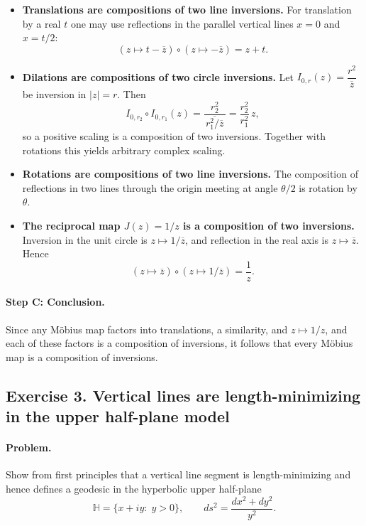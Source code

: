 \documentclass[12pt,a4paper]{article}
\theoremstyle{plain}
\theoremstyle{definition}      %
\begin{document}
\begin{itemize}
	\item \textbf{Translations are compositions of two line inversions.}
	For translation by a real $t$ one may use reflections in the parallel vertical lines $x=0$ and $x=t/2$:
	\[
	(z\mapsto t-\overline{z})\circ(z\mapsto -\overline{z}) = z+t.
	\]
	
	\item \textbf{Dilations are compositions of two circle inversions.}
	Let $I_{0,r}(z)=\dfrac{r^2}{\overline{z}}$ be inversion in $|z|=r$. Then
	\[
	I_{0,r_2}\circ I_{0,r_1}(z)
	=\frac{r_2^2}{\overline{\,r_1^2/\overline{z}\,}}
	=\frac{r_2^2}{r_1^2}\,z,
	\]
	so a positive scaling is a composition of two inversions. Together with rotations this yields arbitrary complex scaling.
	
	\item \textbf{Rotations are compositions of two line inversions.}
	The composition of reflections in two lines through the origin meeting at angle $\theta/2$ is rotation by $\theta$.
	
	\item \textbf{The reciprocal map $J(z)=1/z$ is a composition of two inversions.}
	Inversion in the unit circle is $z\mapsto 1/\overline{z}$, and reflection in the real axis is $z\mapsto \overline{z}$. Hence
	\[
	(z\mapsto \overline{z})\circ(z\mapsto 1/\overline{z})=\frac{1}{z}.
	\]
\end{itemize}

\paragraph{\textbf{Step C: Conclusion.}}
Since any Möbius map factors into translations, a similarity, and $z\mapsto 1/z$, and each of these factors is a composition of inversions, it follows that every Möbius map is a composition of inversions.



\subsection*{\textbf{Exercise 3. Vertical lines are length-minimizing in the upper half-plane model}}

\paragraph{\textbf{Problem.}}
Show from first principles that a vertical line segment is length-minimizing and hence defines a geodesic in the hyperbolic upper half-plane
\[
\mathbb H=\{x+iy:\;y>0\},\qquad
ds^2=\frac{dx^2+dy^2}{y^2}.
\]
\end{document}
